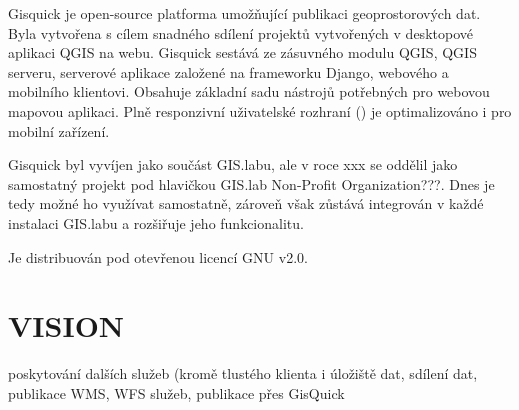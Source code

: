 Gisquick je open-source platforma umožňující publikaci geoprostorových dat. Byla vytvořena s cílem snadného sdílení projektů vytvořených v desktopové aplikaci QGIS na webu. Gisquick sestává ze zásuvného modulu QGIS, QGIS serveru, serverové aplikace založené na frameworku Django, webového a mobilního klientovi. Obsahuje základní sadu nástrojů potřebných pro webovou mapovou aplikaci. Plně responzivní uživatelské rozhraní () je optimalizováno i pro mobilní zařízení.

Gisquick byl vyvíjen jako součást GIS.labu, ale v roce xxx se oddělil jako samostatný projekt pod hlavičkou GIS.lab Non-Profit Organization???. Dnes je tedy možné ho využívat samostatně, zároveň však zůstává integrován v každé instalaci GIS.labu a rozšiřuje jeho funkcionalitu.

Je distribuován pod otevřenou licencí GNU  v2.0.

\section{VISION}
poskytování dalších služeb (kromě tlustého klienta i úložiště dat, sdílení dat, publikace WMS, WFS služeb, publikace přes GisQuick